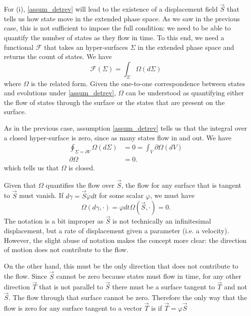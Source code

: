 \documentclass[10pt,twocolumn, nofootinbib]{revtex4-2}
\begin{document}
For (i), \ref{assum_detrev}  will lead to the existence of a displacement field $\vec{S}$ that tells us how state move in the extended phase space. As we saw in the previous case, this is not sufficient to impose the full condition: we need to be able to quantify the number of states as they flow in time. To this end, we need a functional $\mathcal{F}$ that takes an hyper-surfaces $\Sigma$ in the extended phase space and returns the count of states. We have 
\begin{equation}
	\mathcal{F}(\Sigma) = \int_\Sigma \Omega(d\Sigma)
\end{equation}
where $\Omega$ is the related form. Given the one-to-one correspondence between states and evolutions under \ref{assum_detrev}, $\Omega$ can be understood as quantifying either the flow of states through the surface or the states that are present on the surface.

As in the previous case, assumption \ref{assum_detrev} tells us that the integral over a closed hyper-surface is zero, since as many states flow in and out. We have
\begin{equation}
	\begin{aligned}
		\oint_{\Sigma = \partial V} \Omega(d\Sigma) &= 0 = \int_V \partial \Omega(dV) \\
		\partial\Omega &= 0.
	\end{aligned}
\end{equation}
which tells us that $\Omega$ is closed.

Given that $\Omega$ quantifies the flow over $\vec{S}$, the flow for any surface that is tangent to $\vec{S}$ must vanish. If $d\gamma = \vec{S} \varphi dt$ for some scalar $\varphi$, we must have
\begin{equation}
	\Omega(d\gamma, \cdot) = \varphi dt \Omega(\vec{S}, \cdot) = 0.
\end{equation}
The notation is a bit improper as $\vec{S}$ is not technically an infinitesimal displacement, but a rate of displacement given a parameter (i.e. a velocity). However, the slight abuse of notation makes the concept more clear: the direction of motion does not contribute to the flow.

On the other hand, this must be the only direction that does not contribute to the flow. Since $\vec{S}$ cannot be zero because states must flow in time, for any other direction $\vec{T}$ that is not parallel to $\vec{S}$ there must be a surface tangent to $\vec{T}$ and not $\vec{S}$. The flow through that surface cannot be zero. Therefore the only way that the flow is zero for any surface tangent to a vector $\vec{T}$ is if $\vec{T}= \varphi \vec{S}$
\end{document}

